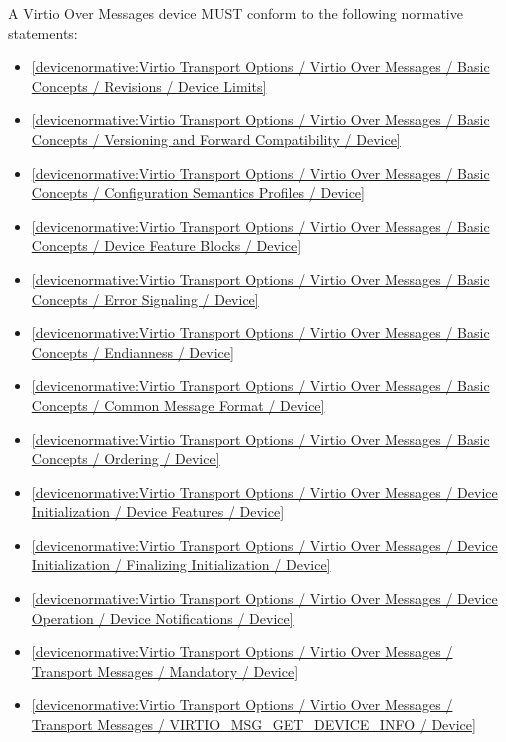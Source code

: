 \label{sec:Conformance / Device Conformance / Virtio Over Messages Device Conformance}

A Virtio Over Messages device MUST conform to the following normative statements:

\begin{itemize}
\item \ref{devicenormative:Virtio Transport Options / Virtio Over Messages / Basic Concepts / Revisions / Device Limits}
\item \ref{devicenormative:Virtio Transport Options / Virtio Over Messages / Basic Concepts / Versioning and Forward Compatibility / Device}
\item \ref{devicenormative:Virtio Transport Options / Virtio Over Messages / Basic Concepts / Configuration Semantics Profiles / Device}
\item \ref{devicenormative:Virtio Transport Options / Virtio Over Messages / Basic Concepts / Device Feature Blocks / Device}
\item \ref{devicenormative:Virtio Transport Options / Virtio Over Messages / Basic Concepts / Error Signaling / Device}
\item \ref{devicenormative:Virtio Transport Options / Virtio Over Messages / Basic Concepts / Endianness / Device}
\item \ref{devicenormative:Virtio Transport Options / Virtio Over Messages / Basic Concepts / Common Message Format / Device}
\item \ref{devicenormative:Virtio Transport Options / Virtio Over Messages / Basic Concepts / Ordering / Device}
\item \ref{devicenormative:Virtio Transport Options / Virtio Over Messages / Device Initialization / Device Features / Device}
\item \ref{devicenormative:Virtio Transport Options / Virtio Over Messages / Device Initialization / Finalizing Initialization / Device}
\item \ref{devicenormative:Virtio Transport Options / Virtio Over Messages / Device Operation / Device Notifications / Device}
\item \ref{devicenormative:Virtio Transport Options / Virtio Over Messages / Transport Messages / Mandatory / Device}
\item \ref{devicenormative:Virtio Transport Options / Virtio Over Messages / Transport Messages / VIRTIO_MSG_GET_DEVICE_INFO / Device}

\end{itemize}
